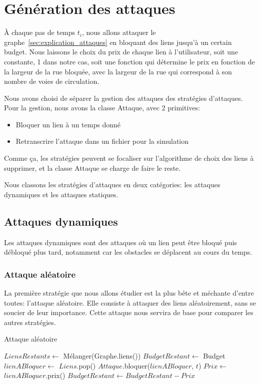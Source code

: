 \section{Génération des attaques}\label{sec:attaques}

\`A chaque pas de temps ${t_{i}}$, nous allons attaquer le graphe~\ref{sec:explication_attaques} en bloquant des liens jusqu'à un certain budget.
Nous laissons le choix du prix de chaque lien à l'utilisateur, soit une constante, 1 dans notre cas, soit une fonction qui détermine le prix en fonction de la largeur de la rue bloquée,
avec la largeur de la rue qui correspond à son nombre de voies de circulation.

Nous avons choisi de séparer la gestion des attaques des stratégies d'attaques.
Pour la gestion, nous avons la classe Attaque, avec 2 primitives:
\begin{itemize}
    \item Bloquer un lien à un temps donné
    \item Retranscrire l'attaque dans un fichier pour la simulation
\end{itemize}
Comme ça, les stratégies peuvent se focaliser sur l'algorithme de choix des liens à supprimer, et la classe Attaque se charge de faire le reste.

Nous classons les stratégies d'attaques en deux catégories: les attaques dynamiques et les attaques statiques.

\subsection{Attaques dynamiques}\label{subsec:attaques_dynamiques}

Les attaques dynamiques sont des attaques où un lien peut être bloqué puis débloqué plus tard, notamment car les obstacles se déplacent au cours du temps.

\subsubsection{Attaque aléatoire}\label{subsubsec:attaque_aleatoire}

La première stratégie que nous allons étudier est la plus bête et méchante d'entre toutes: l'attaque aléatoire.
Elle consiste à attaquer des liens aléatoirement, sans se soucier de leur importance.
Cette attaque nous servira de base pour comparer les autres stratégies.
\begin{algorithm}[H]
\caption{Attaque aléatoire}
\begin{algorithmic}
    \State $LiensRestants \gets$ Mélanger(Graphe.liens())
    \State $BudgetRestant \gets$ Budget
        \State $lienABloquer \gets$ $Liens$.pop()
        \State $Attaque$.bloquer($lienABloquer$, $t$)
        \State $Prix \gets$ $lienABloquer$.prix()
        \State $BudgetRestant \gets BudgetRestant - Prix$
    \EndWhile
\EndFor
\end{algorithmic}
\end{algorithm}

